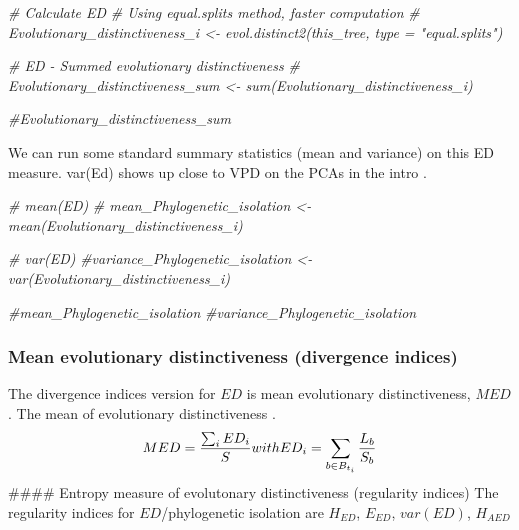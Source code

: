 \documentclass[]{book}
\newenvironment{Shaded}{\begin{snugshade}}{\end{snugshade}}
\newcommand{\CommentTok}[1]{\textcolor[rgb]{0.56,0.35,0.01}{\textit{{#1}}}}
\theoremstyle{definition}
\theoremstyle{definition}
\theoremstyle{definition}
\theoremstyle{remark}
\begin{document}
\begin{Shaded}
\begin{Highlighting}[]
\CommentTok{# Calculate ED}
\CommentTok{# Using equal.splits method, faster computation}
\CommentTok{# Evolutionary_distinctiveness_i <- evol.distinct2(this_tree, type = "equal.splits")  }

\CommentTok{# ED - Summed evolutionary distinctiveness}
\CommentTok{# Evolutionary_distinctiveness_sum <- sum(Evolutionary_distinctiveness_i)}
\end{Highlighting}
\end{Shaded}

\begin{Shaded}
\begin{Highlighting}[]
\CommentTok{#Evolutionary_distinctiveness_sum}
\end{Highlighting}
\end{Shaded}

We can run some standard summary statistics (mean and variance) on this
ED measure. var(Ed) shows up close to VPD on the PCAs in the intro
\citep{Tucker2016}.

\begin{Shaded}
\begin{Highlighting}[]
\CommentTok{# mean(ED)}
\CommentTok{# mean_Phylogenetic_isolation <- mean(Evolutionary_distinctiveness_i)}

\CommentTok{# var(ED)}
\CommentTok{#variance_Phylogenetic_isolation <- var(Evolutionary_distinctiveness_i)}
\end{Highlighting}
\end{Shaded}

\begin{Shaded}
\begin{Highlighting}[]
\CommentTok{#mean_Phylogenetic_isolation}
\CommentTok{#variance_Phylogenetic_isolation}
\end{Highlighting}
\end{Shaded}

\subsubsection{Mean evolutionary distinctiveness (divergence
indices)}\label{mean-evolutionary-distinctiveness-divergence-indices}

The divergence indices version for \(ED\) is mean evolutionary
distinctiveness, \(MED\). The mean of evolutionary distinctiveness
\citep{Redding2003, Isaac2007}. \[
MED = \dfrac
{\sum_{i} ED_{i}}
{S} \\
\ \\
with \\
\ \\
ED_{i} = \sum_{b \in B_{t_{i}}} \dfrac{L_{b}}{S_{b}}
\] \#\#\#\# Entropy measure of evolutonary distinctiveness (regularity
indices) The regularity indices for \(ED\)/phylogenetic isolation are
\(H_{ED}\), \(E_{ED}\), \(var(ED)\), \(H_{AED}\)
\end{document}
